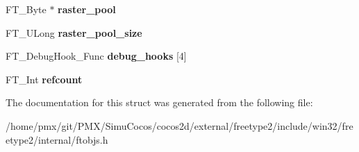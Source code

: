 \begin{DoxyCompactItemize}
\mbox{\label{structFT__LibraryRec___aec8e9e84c48409dc367d01d1d0873051}} 
F\+T\+\_\+\+Byte $\ast$ {\bfseries raster\+\_\+pool}
\item 
\mbox{\label{structFT__LibraryRec___a798afdcaf0cda349eb454b769abfa251}} 
F\+T\+\_\+\+U\+Long {\bfseries raster\+\_\+pool\+\_\+size}
\item 
\mbox{\label{structFT__LibraryRec___acef34efc3853e73fe7d1876b86047c86}} 
F\+T\+\_\+\+Debug\+Hook\+\_\+\+Func {\bfseries debug\+\_\+hooks} \mbox{[}4\mbox{]}
\item 
\mbox{\label{structFT__LibraryRec___a9c8e4e2bde3862cf3eb8011f4ce1dadb}} 
F\+T\+\_\+\+Int {\bfseries refcount}
\end{DoxyCompactItemize}


The documentation for this struct was generated from the following file\+:\begin{DoxyCompactItemize}
\item 
/home/pmx/git/\+P\+M\+X/\+Simu\+Cocos/cocos2d/external/freetype2/include/win32/freetype2/internal/ftobjs.\+h\end{DoxyCompactItemize}
